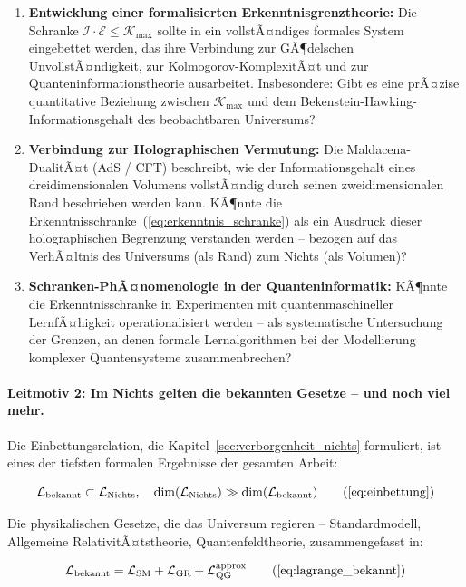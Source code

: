 ﻿\documentclass[12pt,a4paper]{report}
\begin{document}
\begin{enumerate}
	\item \textbf{Entwicklung einer formalisierten Erkenntnisgrenztheorie:} Die Schranke $\mathcal{I} \cdot \mathcal{E} \leq \mathcal{K}_{\max}$ sollte in ein vollstÃ¤ndiges formales System eingebettet werden, das ihre Verbindung zur GÃ¶delschen UnvollstÃ¤ndigkeit, zur Kolmogorov-KomplexitÃ¤t und zur Quanteninformationstheorie ausarbeitet. Insbesondere: Gibt es eine prÃ¤zise quantitative Beziehung zwischen $\mathcal{K}_{\max}$ und dem Bekenstein-Hawking-Informationsgehalt des beobachtbaren Universums?
	\item \textbf{Verbindung zur Holographischen Vermutung:} Die Maldacena-DualitÃ¤t (AdS / CFT) beschreibt, wie der Informationsgehalt eines dreidimensionalen Volumens vollstÃ¤ndig durch seinen zweidimensionalen Rand beschrieben werden kann. KÃ¶nnte die Erkenntnisschranke~(\ref{eq:erkenntnis_schranke}) als ein Ausdruck dieser holographischen Begrenzung verstanden werden -- bezogen auf das VerhÃ¤ltnis des Universums (als Rand) zum Nichts (als Volumen)?
	\item \textbf{Schranken-PhÃ¤nomenologie in der Quanteninformatik:} KÃ¶nnte die Erkenntnisschranke in Experimenten mit quantenmaschineller LernfÃ¤higkeit operationalisiert werden -- als systematische Untersuchung der Grenzen, an denen formale Lernalgorithmen bei der Modellierung komplexer Quantensysteme zusammenbrechen?
\end{enumerate}

\paragraph{Leitmotiv 2: Im Nichts gelten die bekannten Gesetze -- und noch viel mehr.}

Die Einbettungsrelation, die Kapitel~\ref{sec:verborgenheit_nichts} formuliert, ist eines der tiefsten formalen Ergebnisse der gesamten Arbeit:

\begin{equation}
	\mathcal{L}_{\text{bekannt}} \subset \mathcal{L}_{\text{Nichts}}, \quad \dim(\mathcal{L}_{\text{Nichts}}) \gg \dim(\mathcal{L}_{\text{bekannt}})
	\tag{\ref{eq:einbettung}}
\end{equation}

Die physikalischen Gesetze, die das Universum regieren -- Standardmodell, Allgemeine RelativitÃ¤tstheorie, Quantenfeldtheorie, zusammengefasst in:

\begin{equation}
	\mathcal{L}_{\text{bekannt}} = \mathcal{L}_{\text{SM}} + \mathcal{L}_{\text{GR}} + \mathcal{L}_{\text{QG}}^{\text{approx}}
	\tag{\ref{eq:lagrange_bekannt}}
\end{equation}
\end{document}
